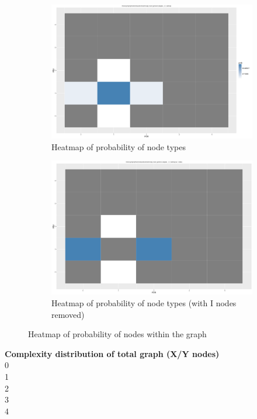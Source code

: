 \documentclass[a4paper, 12pt, oneside]{article}
\begin{document}
\begin{figure}[h]
\centering
\begin{subfigure}[b]{0.45\textwidth}
\includegraphics[width=\textwidth]{graphs/E_heatmap.png}
\caption{\label{fig:Heat}Heatmap of probability of node types}
\end{subfigure}
\begin{subfigure}[b]{0.45\textwidth}
\includegraphics[width=\textwidth]{graphs/E_heatmap_noI.png}
\caption{\label{fig:Heat without I}Heatmap of probability of node types (with I nodes removed)}
\end{subfigure}
\caption{Heatmap of probability of nodes within the graph}\label{fig:E_and_I}
\end{figure}
\newpage

\textbf{Complexity distribution of total graph (X/Y nodes)}\\
0\\
1\\
2\\
3\\
4\\
\end{document}
